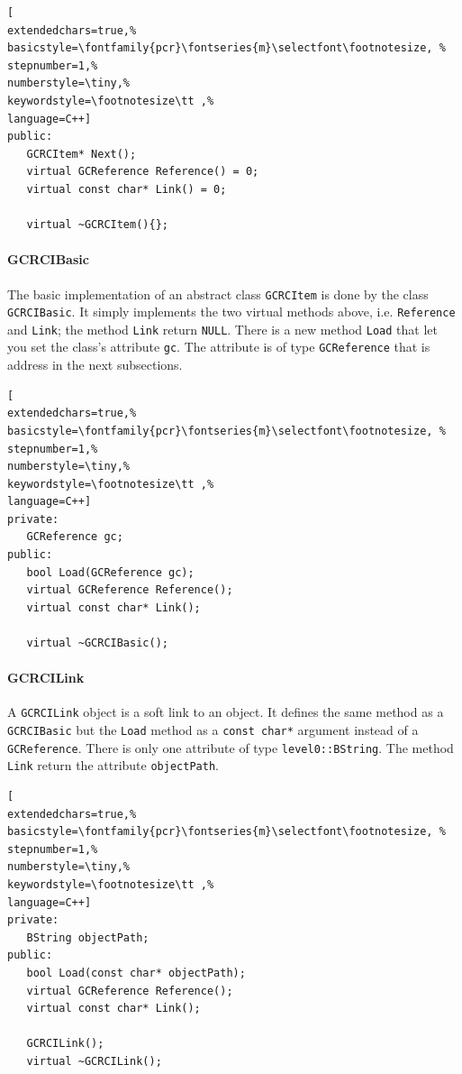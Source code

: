 \begin{lstlisting}[
extendedchars=true,%
basicstyle=\fontfamily{pcr}\fontseries{m}\selectfont\footnotesize, %
stepnumber=1,%
numberstyle=\tiny,%
keywordstyle=\footnotesize\tt ,%
language=C++]
public:
   GCRCItem* Next();
   virtual GCReference Reference() = 0;
   virtual const char* Link() = 0;

   virtual ~GCRCItem(){};
\end{lstlisting}

\paragraph{GCRCIBasic}
The basic implementation of an abstract class \texttt{GCRCItem} is done by the class \texttt{GCRCIBasic}. It simply implements the two virtual methods above, i.e. \texttt{Reference} and \texttt{Link}; the method \texttt{Link} return \texttt{NULL}. There is a new method \texttt{Load} that let you set the class's attribute \texttt{gc}. The attribute is of type \texttt{GCReference} that is address in the next subsections.

\begin{lstlisting}[
extendedchars=true,%
basicstyle=\fontfamily{pcr}\fontseries{m}\selectfont\footnotesize, %
stepnumber=1,%
numberstyle=\tiny,%
keywordstyle=\footnotesize\tt ,%
language=C++]
private:
   GCReference gc;
public:
   bool Load(GCReference gc);
   virtual GCReference Reference();
   virtual const char* Link();

   virtual ~GCRCIBasic();
\end{lstlisting}

\paragraph{GCRCILink}
A \texttt{GCRCILink} object is a soft link to an object. It defines the same method as a \texttt{GCRCIBasic} but the \texttt{Load} method as a \texttt{const char*} argument instead of a \texttt{GCReference}. There is only one attribute of type \texttt{level0::BString}. The method \texttt{Link} return the attribute \texttt{objectPath}.

\begin{lstlisting}[
extendedchars=true,%
basicstyle=\fontfamily{pcr}\fontseries{m}\selectfont\footnotesize, %
stepnumber=1,%
numberstyle=\tiny,%
keywordstyle=\footnotesize\tt ,%
language=C++]
private:
   BString objectPath;
public:
   bool Load(const char* objectPath);
   virtual GCReference Reference();
   virtual const char* Link();

   GCRCILink();
   virtual ~GCRCILink();
\end{lstlisting}



